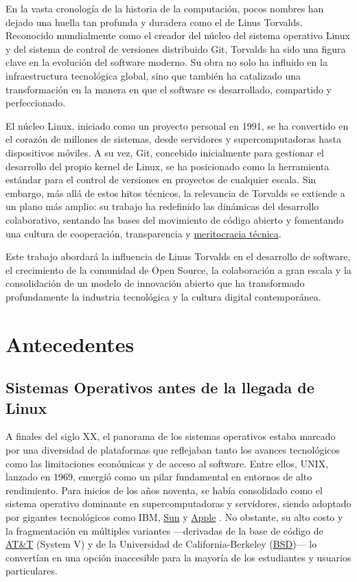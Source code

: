 \documentclass[a4paper,12pt]{article}
\begin{document}
En la vasta cronología de la historia de la computación, pocos nombres han
dejado una huella tan profunda y duradera como el de Linus Torvalds. Reconocido
mundialmente como el creador del núcleo del sistema operativo Linux y del
sistema de control de versiones distribuido Git, Torvalds ha sido una figura
clave en la evolución del software moderno. Su obra no solo ha influido en la
infraestructura tecnológica global, sino que también ha catalizado una
transformación en la manera en que el software es desarrollado, compartido y
perfeccionado.

El núcleo Linux, iniciado como un proyecto personal en 1991, se ha convertido en
el corazón de millones de sistemas, desde servidores y supercomputadoras hasta
dispositivos móviles. A su vez, Git, concebido inicialmente para gestionar el
desarrollo del propio kernel de Linux, se ha posicionado como la herramienta
estándar para el control de versiones en proyectos de cualquier escala. Sin
embargo, más allá de estos hitos técnicos, la relevancia de Torvalds se extiende
a un plano más amplio: su trabajo ha redefinido las dinámicas del desarrollo
colaborativo, sentando las bases del movimiento de código abierto y fomentando
una cultura de cooperación, transparencia y \hyperlink{meritocracia}{meritocracia técnica}.

Este trabajo abordará la influencia de Linus Torvalds en el desarrollo de
software, el crecimiento de la comunidad de Open Source, la colaboración a gran
escala y la consolidación de un modelo de innovación abierto que ha transformado
profundamente la industria tecnológica y la cultura digital contemporánea.  
\newpage

\section{Antecedentes} 

\subsection{Sistemas Operativos antes de la llegada de Linux}
A finales del siglo XX, el panorama de los sistemas operativos estaba marcado
por una diversidad de plataformas que reflejaban tanto los avances tecnológicos
como las limitaciones económicas y de acceso al software. Entre ellos,
UNIX, lanzado en 1969, emergió como un pilar fundamental en
entornos de alto rendimiento. Para inicios de los años noventa, se había
consolidado como el sistema operativo dominante en supercomputadoras y
servidores, siendo adoptado por gigantes tecnológicos como \hypertarget{ibm}{IBM},
\hyperlink{sun}{Sun} y \hyperlink{apple}{Apple} .  No obstante, su alto costo y la
fragmentación en múltiples variantes —derivadas de la base de código de
\hyperlink{att}{AT\&T} (System V) y de la Universidad de California-Berkeley
(\hyperlink{bsd}{BSD})— lo convertían en una opción inaccesible para la mayoría
de los estudiantes y usuarios particulares.
\end{document}
